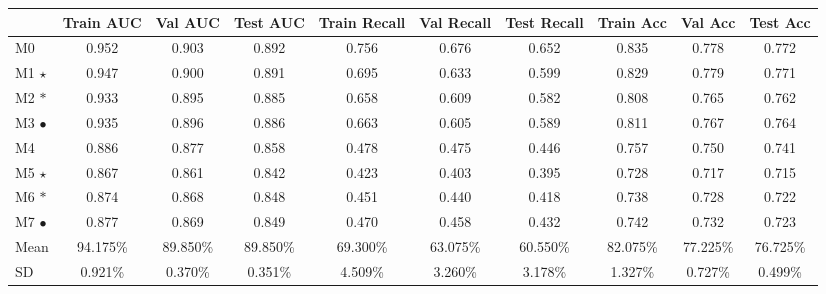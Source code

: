 \begin{landscape}

\begin{table}
\centering
\begin{tabular}{lccccccccc}
    \toprule
 & Train AUC & Val AUC &  Test AUC & Train Recall & Val Recall &  Test Recall & Train Acc & Val Acc & Test Acc \\
 \midrule
M0 & 0.952 & 0.903 & 0.892 & 0.756 & 0.676 & 0.652 & 0.835 & 0.778 & 0.772 \\
M1 $\star$ & 0.947 & 0.900 & 0.891 & 0.695 & 0.633 & 0.599 & 0.829 & 0.779 & 0.771 \\
M2 $\ast$ & 0.933 & 0.895 & 0.885 & 0.658 & 0.609 & 0.582 & 0.808 & 0.765 & 0.762 \\
M3 $\bullet$ & 0.935 & 0.896 & 0.886 & 0.663 & 0.605 & 0.589 & 0.811 & 0.767 & 0.764 \\
\midrule
\cellcolor{gray!50}M4 & \cellcolor{gray!50}0.886 & \cellcolor{gray!50}0.877 & \cellcolor{gray!50}0.858 & \cellcolor{gray!50}0.478 & \cellcolor{gray!50}0.475 & \cellcolor{gray!50}0.446 & \cellcolor{gray!50}0.757 & \cellcolor{gray!50}0.750 & \cellcolor{gray!50}0.741 \\
\cellcolor{gray!50}M5 $\star$ & \cellcolor{gray!50}0.867 & \cellcolor{gray!50}0.861 & \cellcolor{gray!50}0.842 & \cellcolor{gray!50}0.423 & \cellcolor{gray!50}0.403 & \cellcolor{gray!50}0.395 & \cellcolor{gray!50}0.728 & \cellcolor{gray!50}0.717 &  \cellcolor{gray!50}0.715 \\
\cellcolor{gray!50}M6 $\ast$ & \cellcolor{gray!50}0.874 & \cellcolor{gray!50}0.868 & \cellcolor{gray!50}0.848 & \cellcolor{gray!50}0.451 & \cellcolor{gray!50}0.440 & \cellcolor{gray!50}0.418 & \cellcolor{gray!50}0.738 & \cellcolor{gray!50}0.728 &  \cellcolor{gray!50}0.722 \\
\cellcolor{gray!50}M7 $\bullet$ & \cellcolor{gray!50}0.877 & \cellcolor{gray!50}0.869 & \cellcolor{gray!50}0.849 & \cellcolor{gray!50}0.470 & \cellcolor{gray!50}0.458 & \cellcolor{gray!50}0.432 & \cellcolor{gray!50}0.742 & \cellcolor{gray!50}0.732 &  \cellcolor{gray!50}0.723 \\

\midrule

  Mean &  94.175\% & 89.850\% & 89.850\%  & 69.300\% & 63.075\% & 60.550\% & 82.075\% & 77.225\% & 76.725\% \\
  SD   & 0.921\% & 0.370\% & 0.351\% &  4.509\% & 3.260\% & 3.178\% & 1.327\% & 0.727\% & 0.499\% \\

\midrule


\end{tabular}
\end{table}
\end{landscape}
